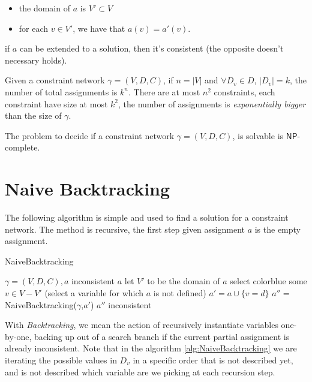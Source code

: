 \documentclass[10pt, letterpaper]{report}
\begin{document}
\begin{itemize}
    \item the domain of $a$ is $V'\subset V$
    \item for each $v\in V'$, we have that $a(v)=a'(v)$.
\end{itemize}
\begin{proposition}
    if $a$ can be extended to a solution, then it's consistent (the opposite doesn't necessary holds).
\end{proposition}
Given a constraint network $\gamma=(V,D,C)$, if $n=|V|$ and $\forall D_v\in D$, $|D_v|=k$, the number of total assignments is $k^n$. There are at most $n^2$ constraints, each constraint have size at most $k^2$, the number of assignments is \textit{exponentially bigger} than the size of $\gamma$.\begin{theorem}
    The problem to decide if a constraint network $\gamma=(V,D,C)$, is solvable is  $\mathsf{NP}$-complete.
\end{theorem}
\section{Naive Backtracking}
The following algorithm is simple and used to find a solution for a constraint network. The method is recursive, the first step given assignment $a$ is the empty assignment.
 \begin{algorithm}
    \caption{NaiveBacktracking}\label{alg:NaiveBacktracking}
    \begin{algorithmic}
    \Require $\gamma=(V,D,C),a$
     \State\Return inconsistent\EndIf
     \State\Return $a$\EndIf
    \State let $V'$ to be the domain of $a$
    \State select color{blue} some  \color{black} $v\in V-V'$ (select a variable for which $a$ is not defined)
    \State $a'=a\cup \{v=d\}$
    \State $a''=$NaiveBacktracking($\gamma$,$a'$)
     \State\Return $a''$\EndIf
    \EndFor
    \State\Return inconsistent
    \end{algorithmic}
\end{algorithm}
With \textit{Backtracking}, we mean the action of recursively instantiate variables one-by-one, backing up out
of a search branch if the current partial assignment is already inconsistent.
Note that in the algorithm \ref{alg:NaiveBacktracking} we are iterating the possible values in $D_v$ in a specific \color{blue} order \color{black} that is not described yet, and is not described which variable are we picking at each recursion step.\bigskip 
\end{document}
